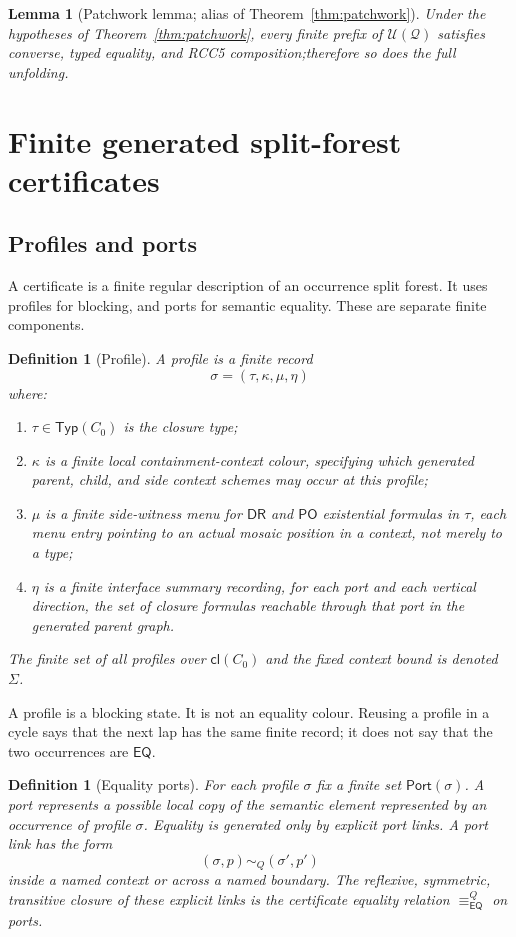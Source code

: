 \documentclass[11pt]{article}
\newtheorem{lemma}[theorem]{Lemma}
\newtheorem{definition}[theorem]{Definition}
\newcommand{\EQ}{\mathsf{EQ}}
\newcommand{\DR}{\mathsf{DR}}
\newcommand{\PO}{\mathsf{PO}}
\newcommand{\Cl}{\mathsf{cl}}
\newcommand{\Typ}{\mathsf{Typ}}
\newcommand{\Q}{\mathcal Q}
\newcommand{\U}{\mathcal U}
\newcommand{\Port}{\mathsf{Port}}
\newcommand{\eqc}{\equiv_{\EQ}}
\begin{document}
\begin{lemma}[Patchwork lemma; alias of Theorem~\ref{thm:patchwork}]\label{lem:patchwork}
Under the hypotheses of Theorem~\ref{thm:patchwork}, every finite
prefix of $\U(\Q)$ satisfies converse, typed equality, and RCC5
composition;\@ therefore so does the full unfolding.
\end{lemma}

\section{Finite generated split-forest certificates}
\label{sec:certificates}

\subsection{Profiles and ports}

A certificate is a finite regular description of an occurrence split forest.  It uses profiles for blocking, and ports for semantic equality.  These are separate finite components.

\begin{definition}[Profile]
A profile is a finite record
\[
  \sigma=(\tau,\kappa,\mu,\eta)
\]
where:
\begin{enumerate}[label=(P\arabic*)]
\item $\tau\in\Typ(C_0)$ is the closure type;
\item $\kappa$ is a finite local containment-context colour, specifying which generated parent, child, and side context schemes may occur at this profile;
\item $\mu$ is a finite side-witness menu for $\DR$ and $\PO$ existential formulas in $\tau$, each menu entry pointing to an actual mosaic position in a context, not merely to a type;
\item $\eta$ is a finite interface summary recording, for each port and each vertical direction, the set of closure formulas reachable through that port in the generated parent graph.
\end{enumerate}
The finite set of all profiles over $\Cl(C_0)$ and the fixed context bound is denoted $\Sigma$.
\end{definition}

A profile is a blocking state.  It is not an equality colour.  Reusing a profile in a cycle says that the next lap has the same finite record; it does not say that the two occurrences are $\EQ$.

\begin{definition}[Equality ports]
For each profile $\sigma$ fix a finite set $\Port(\sigma)$.  A port represents a possible local copy of the semantic element represented by an occurrence of profile $\sigma$.  Equality is generated only by explicit port links.  A port link has the form
\[
  (\sigma,p) \sim_Q (\sigma',p')
\]
inside a named context or across a named boundary.  The reflexive, symmetric, transitive closure of these explicit links is the certificate equality relation $\eqc^{Q}$ on ports.
\end{definition}
\end{document}

